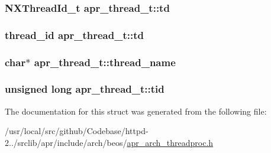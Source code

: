 \subsubsection[{\texorpdfstring{td}{td}}]{\setlength{\rightskip}{0pt plus 5cm}N\+X\+Thread\+Id\+\_\+t apr\+\_\+thread\+\_\+t\+::td}\hypertarget{structapr__thread__t_a1c1cf1146c92060226a73836f65cba0b}{}\label{structapr__thread__t_a1c1cf1146c92060226a73836f65cba0b}
\subsubsection[{\texorpdfstring{td}{td}}]{\setlength{\rightskip}{0pt plus 5cm}thread\+\_\+id apr\+\_\+thread\+\_\+t\+::td}\hypertarget{structapr__thread__t_aae7a4bb7692d30e3e4899581a5e87ff0}{}\label{structapr__thread__t_aae7a4bb7692d30e3e4899581a5e87ff0}
\subsubsection[{\texorpdfstring{thread\+\_\+name}{thread_name}}]{\setlength{\rightskip}{0pt plus 5cm}char$\ast$ apr\+\_\+thread\+\_\+t\+::thread\+\_\+name}\hypertarget{structapr__thread__t_ad255d124aaee44436af04501e5196520}{}\label{structapr__thread__t_ad255d124aaee44436af04501e5196520}
\subsubsection[{\texorpdfstring{tid}{tid}}]{\setlength{\rightskip}{0pt plus 5cm}unsigned long apr\+\_\+thread\+\_\+t\+::tid}\hypertarget{structapr__thread__t_aa5d9bab844e08c0cc551f31492b3ab97}{}\label{structapr__thread__t_aa5d9bab844e08c0cc551f31492b3ab97}


The documentation for this struct was generated from the following file\+:\begin{DoxyCompactItemize}
\item 
/usr/local/src/github/\+Codebase/httpd-\/2../srclib/apr/include/arch/beos/\hyperlink{beos_2apr__arch__threadproc_8h}{apr\+\_\+arch\+\_\+threadproc.\+h}\end{DoxyCompactItemize}
